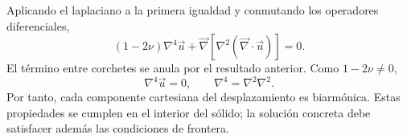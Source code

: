 Aplicando el laplaciano a la primera igualdad y conmutando los operadores diferenciales,
\[
(1-2\nu)\nabla^4\vec u
+\vec\nabla\left[\nabla^2(\vec\nabla\cdot\vec u)\right]=0.
\]
El término entre corchetes se anula por el resultado anterior. Como $1-2\nu\ne0$,
\[
\boxed{\nabla^4\vec u=0},
\qquad \nabla^4=\nabla^2\nabla^2.
\]
Por tanto, cada componente cartesiana del desplazamiento es biarmónica. Estas propiedades se cumplen en el interior del sólido; la solución concreta debe satisfacer además las condiciones de frontera.
